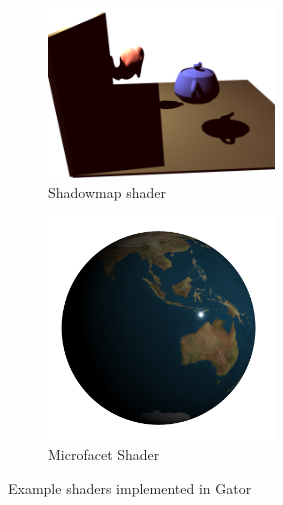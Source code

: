 {\begin{figure}
	\centering
	\begin{subfigure}[A]{.45\linewidth}
		\includegraphics[width=60mm]{fig/shadowmap.png}
		\caption{Shadowmap shader}
	\end{subfigure}
	\begin{subfigure}[B]{.45\linewidth}
		\includegraphics[width=60mm]{fig/microfacet.png}
		\caption{Microfacet Shader}
	\end{subfigure}
	\caption{Example shaders implemented in Gator}
	\label{fig:shaders-2}
\end{figure}


}
